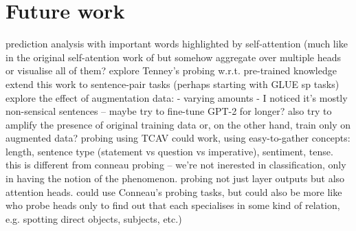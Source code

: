 \documentclass[bsc,frontabs,twoside,singlespacing,parskip,deptreport]{infthesis}
\begin{document}
\chapter{Future work}{
  prediction analysis with important words highlighted by self-attention (much like in the original self-atention work of \citet{Lin_2017} but somehow aggregate over multiple heads or visualise all of them?
  explore Tenney's probing w.r.t. pre-trained knowledge
  extend this work to sentence-pair tasks (perhaps starting with GLUE sp tasks)
  explore the effect of augmentation data:
  - varying amounts
  - I noticed it's mostly non-sensical sentences -- maybe try to fine-tune GPT-2 for longer? also try to amplify the presence of original training data or, on the other hand, train only on augmented data?
  probing using TCAV \citep{Kim_2017} could work, using easy-to-gather concepts: length, sentence type (statement vs question vs imperative), sentiment, tense. this is different from conneau probing -- we're not inerested in classification, only in having the notion of the phenomenon.
  probing not just layer outputs but also attention heads. could use Conneau's probing tasks, but could also be more like \citet{Clark_2019} who probe heads only to find out that each specialises in some kind of relation, e.g. spotting direct objects, subjects, etc.)
}




\appendix
\end{document}

